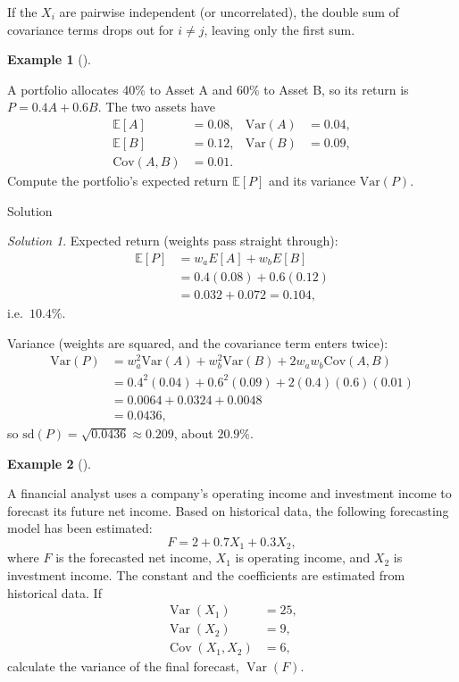 \documentclass[
  12pt,
  letterpaper,
]{scrbook}
\theoremstyle{plain}
\theoremstyle{definition}
\newtheorem{example}{Example}[chapter]
\theoremstyle{remark}
\newtheorem{refsolution}{Solution}[chapter]
\begin{document}
If the \(X_i\) are pairwise independent (or uncorrelated), the double
sum of covariance terms drops out for \(i\neq j\), leaving only the
first sum.

\begin{example}[]\protect\hypertarget{exm-12}{}\label{exm-12}

A portfolio allocates 40\% to Asset A and 60\% to Asset B, so its return
is \(P = 0.4A + 0.6B\). The two assets have \[
\begin{aligned}
\mathbb{E}[A] &= 0.08, & \text{Var}(A) &= 0.04, \\
\mathbb{E}[B] &= 0.12, & \text{Var}(B) &= 0.09, \\
\text{Cov}(A,B) &= 0.01.
\end{aligned}
\] Compute the portfolio's expected return \(\mathbb{E}[P]\) and its
variance \(\text{Var}(P)\).

\end{example}

Solution

\begin{refsolution}
Expected return (weights pass straight through): \[
\begin{aligned}
\mathbb{E}[P] &= w_a E[A] + w_b E[B] \\
&= 0.4(0.08)+0.6(0.12)\\
&= 0.032+0.072 = 0.104,
\end{aligned}
\] i.e.~\(10.4\%\).

Variance (weights are squared, and the covariance term enters twice): \[
\begin{aligned}
\text{Var}(P) &= w_a^2\text{Var}(A) + w_b^2\text{Var}(B) + 2 w_a w_b \text{Cov}(A,B) \\
&= 0.4^2 (0.04) + 0.6^2(0.09) + 2(0.4)(0.6)(0.01) \\
&= 0.0064 + 0.0324 + 0.0048 \\
&= 0.0436,
\end{aligned}
\] so \(\text{sd}(P)=\sqrt{0.0436}\approx 0.209\), about \(20.9\%\).

\label{sol-12}

\end{refsolution}

\begin{example}[]\protect\hypertarget{exm-13}{}\label{exm-13}

A financial analyst uses a company's operating income and investment
income to forecast its future net income. Based on historical data, the
following forecasting model has been estimated: \[
F = 2 + 0.7X_1 + 0.3X_2,
\] where \(F\) is the forecasted net income, \(X_1\) is operating
income, and \(X_2\) is investment income. The constant and the
coefficients are estimated from historical data. If \[
\begin{aligned}
\operatorname{Var}(X_1) &= 25, \\
\operatorname{Var}(X_2) &= 9, \\
\operatorname{Cov}(X_1,X_2) &= 6,
\end{aligned}
\] calculate the variance of the final forecast,
\(\operatorname{Var}(F)\).

\end{example}
\end{document}
